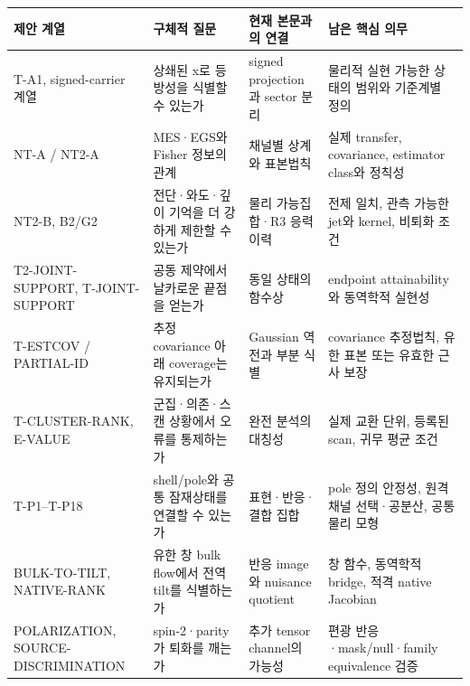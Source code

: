\documentclass[11pt,a4paper]{article}
\begin{document}
{\small\setlength{\tabcolsep}{4pt}\renewcommand{\arraystretch}{1.3}

\begin{longtable}{>{\raggedright\arraybackslash}p{0.2000\dimexpr\linewidth-32pt\relax}>{\raggedright\arraybackslash}p{0.2700\dimexpr\linewidth-32pt\relax}>{\raggedright\arraybackslash}p{0.2700\dimexpr\linewidth-32pt\relax}>{\raggedright\arraybackslash}p{0.2600\dimexpr\linewidth-32pt\relax}}\toprule

제안 계열 & 구체적 질문 & 현재 본문과의 연결 & 남은 핵심 의무 \\

\midrule\endhead

T-A1, signed-carrier 계열 & 상쇄된 x로 등방성을 식별할 수 있는가 & signed projection과 sector 분리 & 물리적 실현 가능한 상태의 범위와 기준계별 정의 \\

NT-A / NT2-A & MES·EGS와 Fisher 정보의 관계 & 채널별 상계와 표본법칙 & 실제 transfer, covariance, estimator class와 정칙성 \\

NT2-B, B2/G2 & 전단·와도·깊이 기억을 더 강하게 제한할 수 있는가 & 물리 가능집합·R3 응력 이력 & 전제 일치, 관측 가능한 jet와 kernel, 비퇴화 조건 \\

T2-JOINT-SUPPORT, T-JOINT-SUPPORT & 공동 제약에서 날카로운 끝점을 얻는가 & 동일 상태의 함수상 & endpoint attainability와 동역학적 실현성 \\

T-ESTCOV / PARTIAL-ID & 추정 covariance 아래 coverage는 유지되는가 & Gaussian 역전과 부분 식별 & covariance 추정법칙, 유한 표본 또는 유효한 근사 보장 \\

T-CLUSTER-RANK, E-VALUE & 군집·의존·스캔 상황에서 오류를 통제하는가 & 완전 분석의 대칭성 & 실제 교환 단위, 등록된 scan, 귀무 평균 조건 \\

T-P1–T-P18 & shell/pole와 공통 잠재상태를 연결할 수 있는가 & 표현·반응·결합 집합 & pole 정의 안정성, 원격 채널 선택·공분산, 공통 물리 모형 \\

BULK-TO-TILT, NATIVE-RANK & 유한 창 bulk flow에서 전역 tilt를 식별하는가 & 반응 image와 nuisance quotient & 창 함수, 동역학적 bridge, 적격 native Jacobian \\

POLARIZATION, SOURCE-DISCRIMINATION & spin-2·parity가 퇴화를 깨는가 & 추가 tensor channel의 가능성 & 편광 반응·mask/null·family equivalence 검증 \\

\bottomrule\end{longtable}}
\end{document}
